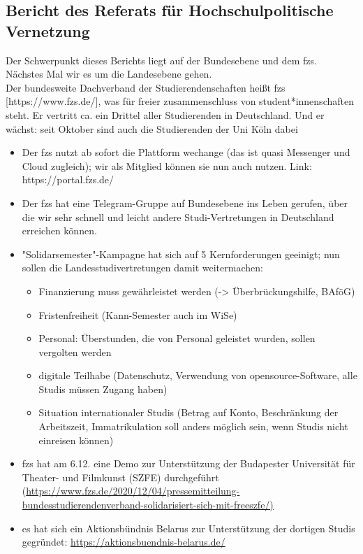 \subsection{Bericht des Referats für Hochschulpolitische Vernetzung}
Der Schwerpunkt dieses Berichts liegt auf der Bundesebene und dem fzs. Nächstes Mal wir es um die Landesebene gehen.\\
Der bundesweite Dachverband der Studierendenschaften heißt fzs [https://www.fzs.de/], was für freier zusammenschluss von student*innenschaften steht. Er vertritt ca. ein Drittel aller Studierenden in Deutschland. Und er wächst: seit Oktober sind auch die Studierenden der Uni Köln dabei
\begin{itemize}
    \item{Der fzs nutzt ab sofort die Plattform wechange (das ist quasi Messenger und Cloud zugleich); wir als Mitglied können sie nun auch nutzen. Link: https://portal.fzs.de/}
    \item{Der fzs hat eine Telegram-Gruppe auf Bundesebene ins Leben gerufen, über die wir sehr schnell und leicht andere Studi-Vertretungen in Deutschland erreichen können.}
    \item{"Solidarsemester"-Kampagne hat sich auf 5 Kernforderungen geeinigt; nun sollen die Landesstudivertretungen damit weitermachen:
        \begin{itemize}
            \item Finanzierung muss gewährleistet werden (-> Überbrückungshilfe, BAföG)
            \item Fristenfreiheit (Kann-Semester auch im WiSe)
            \item Personal: Überstunden, die von Personal geleistet wurden, sollen vergolten werden
            \item digitale Teilhabe (Datenschutz, Verwendung von opensource-Software, alle Studis müssen Zugang haben)
            \item Situation internationaler Studis (Betrag auf Konto, Beschränkung der Arbeitszeit, Immatrikulation soll anders möglich sein, wenn Studis nicht einreisen können)
        \end{itemize}
    }
    \item{fzs hat am 6.12. eine Demo zur Unterstützung der Budapester Universität für Theater- und Filmkunst (SZFE) durchgeführt (\url{https://www.fzs.de/2020/12/04/pressemitteilung-bundesstudierendenverband-solidarisiert-sich-mit-freeszfe/)}}
    \item{es hat sich ein Aktionsbündnis Belarus zur Unterstützung der dortigen Studis gegründet: \url{https://aktionsbuendnis-belarus.de/}}

\end{itemize}

